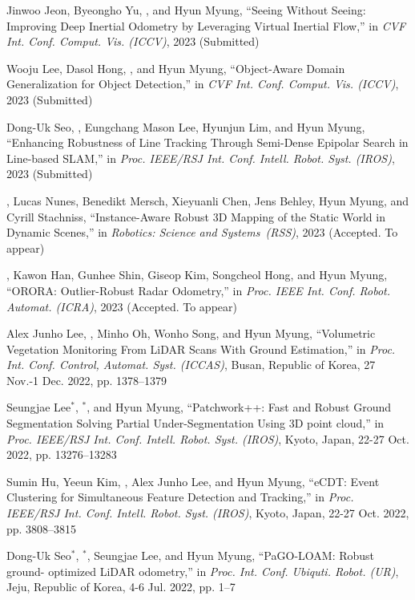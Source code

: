 \begin{pubSubsectionNum}
    \item Jinwoo Jeon, Byeongho Yu, \hyungtaelim, and Hyun Myung, ``Seeing Without Seeing: Improving Deep Inertial Odometry by Leveraging Virtual Inertial Flow,'' in \textit{CVF Int. Conf. Comput. Vis. (ICCV)}, 2023 (Submitted)
    \item Wooju Lee, Dasol Hong, \hyungtaelim, and Hyun Myung, ``Object-Aware Domain Generalization for Object Detection,'' in \textit{CVF Int. Conf. Comput. Vis. (ICCV)}, 2023 (Submitted)
    \item Dong-Uk Seo, \hyungtaelim, Eungchang Mason Lee, Hyunjun Lim, and Hyun Myung, ``Enhancing Robustness of Line Tracking Through Semi-Dense Epipolar Search in Line-based SLAM,'' in \textit{Proc. IEEE/RSJ Int. Conf. Intell. Robot. Syst. (IROS)}, 2023 (Submitted)
    \item \hyungtaelim, Lucas Nunes, Benedikt Mersch, Xieyuanli Chen, Jens Behley, Hyun Myung, and Cyrill Stachniss, ``Instance-Aware Robust 3D Mapping of the Static World in Dynamic Scenes,'' in \textit{Robotics: Science and Systems~(RSS)}, 2023 (Accepted. To appear)
    \item \hyungtaelim, Kawon Han, Gunhee Shin, Giseop Kim, Songcheol Hong, and Hyun Myung, ``ORORA: Outlier-Robust Radar Odometry,'' in \textit{Proc. IEEE Int. Conf. Robot. Automat. (ICRA)}, 2023 (Accepted. To appear)
    \item Alex Junho Lee, \hyungtaelim, Minho Oh, Wonho Song, and Hyun Myung, ``Volumetric Vegetation Monitoring From LiDAR Scans With Ground Estimation,'' in \textit{Proc. Int. Conf. Control, Automat. Syst. (ICCAS)}, Busan, Republic of Korea, 27 Nov.-1 Dec. 2022, pp. 1378--1379
    \item Seungjae Lee$^*$, \hyungtaelim$^*$, and Hyun Myung, ``Patchwork++: Fast and Robust Ground Segmentation Solving Partial Under-Segmentation Using 3D point cloud,'' in \textit{Proc. IEEE/RSJ Int. Conf. Intell. Robot. Syst. (IROS)}, Kyoto, Japan, 22-27 Oct. 2022, pp. 13276--13283
    \item Sumin Hu, Yeeun Kim, \hyungtaelim, Alex Junho Lee, and Hyun Myung, ``eCDT: Event Clustering for Simultaneous Feature Detection and Tracking,'' in \textit{Proc. IEEE/RSJ Int. Conf. Intell. Robot. Syst. (IROS)}, Kyoto, Japan, 22-27 Oct. 2022, pp. 3808--3815
    \item Dong-Uk Seo$^*$, \hyungtaelim$^*$, Seungjae Lee, and Hyun Myung, ``PaGO-LOAM: Robust ground- optimized LiDAR odometry,'' in \textit{Proc. Int. Conf. Ubiquti. Robot. (UR)}, Jeju, Republic of Korea, 4-6 Jul. 2022, pp. 1--7

\end{pubSubsectionNum}
